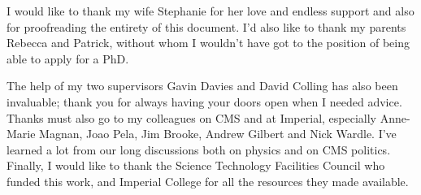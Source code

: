\begin{acknowledgements}
I would like to thank my wife Stephanie for her love and endless support and also for proofreading the entirety of this document. I'd also like to thank my parents Rebecca and Patrick, without whom I wouldn't have got to the position of being able to apply for a PhD.

The help of my two supervisors Gavin Davies and David Colling has also been invaluable; thank you for always having your doors open when I needed advice. Thanks must also go to my colleagues on CMS and at Imperial, especially Anne-Marie Magnan, Joao Pela, Jim Brooke, Andrew Gilbert and Nick Wardle. I've learned a lot from our long discussions both on physics and on CMS politics. Finally, I would like to thank the Science Technology Facilities Council who funded this work, and Imperial College for all the resources they made available.
\end{acknowledgements}



\tableofcontents

